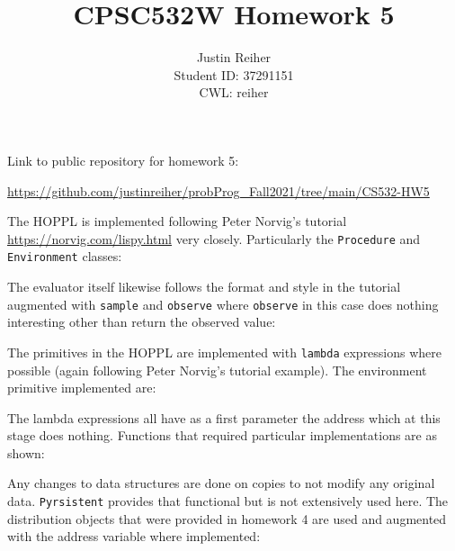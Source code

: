 \documentclass[]{article}
\title{CPSC532W Homework 5}
\author{Justin Reiher\\ Student ID: 37291151\\ CWL: reiher}
\date{}
\begin{document}
\maketitle

Link to public repository for homework 5:
\begin{center}
	\url{https://github.com/justinreiher/probProg_Fall2021/tree/main/CS532-HW5}
\end{center}

The HOPPL is implemented following Peter Norvig's tutorial \url{https://norvig.com/lispy.html} very closely. Particularly the \texttt{Procedure} and \texttt{Environment} classes:

The evaluator itself likewise follows the format and style in the tutorial augmented with \texttt{sample} and \texttt{observe} where \texttt{observe} in this case does nothing interesting other than return the observed value:

The primitives in the HOPPL are implemented with \texttt{lambda} expressions where possible (again following Peter Norvig's tutorial example). The environment primitive implemented are:

The lambda expressions all have as a first parameter the address which at this stage does nothing. Functions that required particular implementations are as shown:

Any changes to data structures are done on copies to not modify any original data. \texttt{Pyrsistent} provides that functional but is not extensively used here. The distribution objects that were provided in homework 4 are used and augmented with the address variable where implemented:

\end{document}
